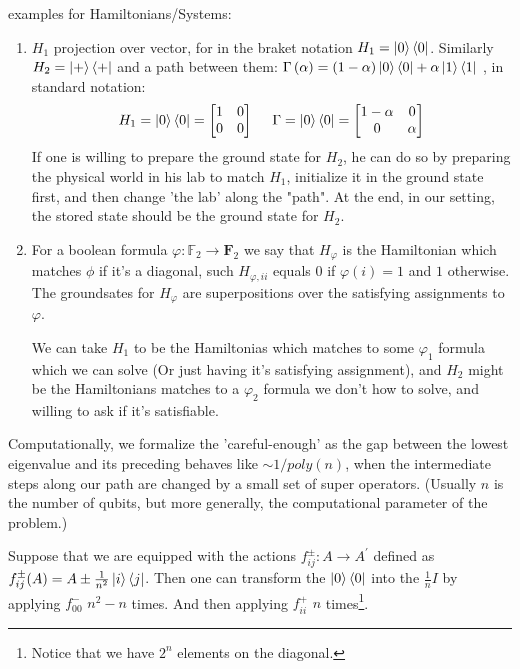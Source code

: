 \documentclass[manuscript,screen,review]{acmart}
\begin{document}
\begin{example} examples for Hamiltonians/Systems: 
\begin{enumerate}
    \item $H_{1}$ projection over vector, for in the braket notation $H_{1} = \ket{0}\bra{0}$. Similarly $H_2 = \ket{+}\bra{+}$ and a path between them: $\Gamma\left(\alpha\right) = \left( 1- \alpha \right) \ket{0}\bra{0} + \alpha \ket{1}\bra{1}$  , in standard notation: 
    \begin{equation*}
        H_{1} = \ket{0}\bra{0} = \begin{bmatrix}
            1 & 0 \\
            0 & 0
        \end{bmatrix} \ \ \ \ \Gamma=\ket{0}\bra{0} = \begin{bmatrix}
            1-\alpha & 0 \\
            0 & \alpha
        \end{bmatrix}
    \end{equation*}
    If one is willing to prepare the ground state for $H_{2}$, he can do so by preparing the physical world in his lab to match $H_{1}$, initialize it in the ground state first, and then change 'the lab' along the "path". At the end, in our setting, the stored state should be the ground state for $H_{2}$.

    \item For a boolean formula $\varphi : \mathbb{F}_2 \rightarrow \mathbf{F}_2$ we say that $H_\varphi$ is the Hamiltonian which matches $\phi$ if it's a diagonal, such $H_{\varphi, ii}$ equals $0$ if $\varphi(i)=1$ and $1$ otherwise. The groundsates for $H_\varphi$ are superpositions over the satisfying assignments to $\varphi$.

    
     We can take $H_{1}$ to be the Hamiltonias which matches to some $\varphi_1$ formula which we can solve (Or just having it's satisfying assignment), and $H_{2}$ might be the Hamiltonians matches to a $\varphi_2$ formula we don't how to solve, and willing to ask if it's satisfiable. 
    
\end{enumerate}

\end{example}
Computationally, we formalize the 'careful-enough' as the gap between the lowest eigenvalue and its preceding behaves like $\sim 1/poly(n)$, when the intermediate steps along our path are changed by a small set of super operators. (Usually $n$ is the number of qubits, but more generally, the computational parameter of the problem.)  
\begin{example}
    Suppose that we are equipped with the actions $f_{ij}^{\pm} : A \rightarrow A^\prime $ defined as $f_{ij}^\pm (A) = A \pm \frac{1}{n^2}\ket{i}\bra{j}$. Then one can transform the $\ket{0}\bra{0}$ into the $\frac{1}{n}I$ by applying $f^{-}_{00}$ $n^{2} - n$ times. And then applying $f^{+}_{ii}$ $n$ times\footnote{Notice that we have $2^n$ elements on the diagonal.}.
\end{example}
    
\end{document}
